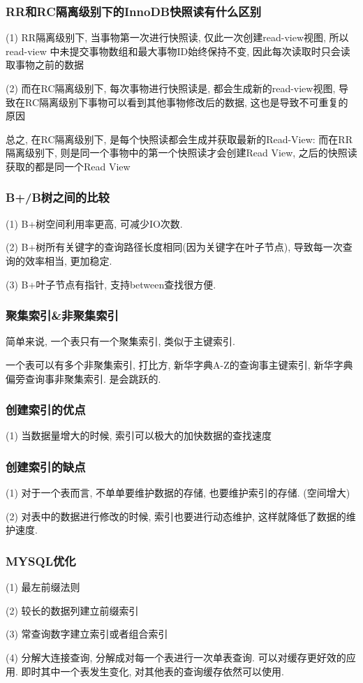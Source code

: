\documentclass[UTF8]{ctexart}
\begin{document}
\subsubsection{RR和RC隔离级别下的InnoDB快照读有什么区别}
(1) RR隔离级别下, 当事物第一次进行快照读, 仅此一次创建read-view视图, 所以read-view
中未提交事物数组和最大事物ID始终保持不变, 因此每次读取时只会读取事物之前的数据 \par
(2) 而在RC隔离级别下, 每次事物进行快照读是, 都会生成新的read-view视图, 导致在RC隔离级别下事物可以看到其他事物修改后的数据, 这也是导致不可重复的原因 \par
总之, 在RC隔离级别下, 是每个快照读都会生成并获取最新的Read-View: 而在RR隔离级别下, 则是同一个事物中的第一个快照读才会创建Read View, 之后的快照读获取的都是同一个Read View \par
\subsubsection{B+/B树之间的比较}
(1) B+树空间利用率更高, 可减少IO次数. \par
(2) B+树所有关键字的查询路径长度相同(因为关键字在叶子节点), 导致每一次查询的效率相当, 更加稳定. \par
(3) B+叶子节点有指针, 支持between查找很方便.
\subsubsection{聚集索引\&非聚集索引}
简单来说, 一个表只有一个聚集索引, 类似于主键索引.

一个表可以有多个非聚集索引, 打比方, 新华字典A-Z的查询事主键索引, 新华字典偏旁查询事非聚集索引. 是会跳跃的.


\subsubsection{创建索引的优点}
(1) 当数据量增大的时候, 索引可以极大的加快数据的查找速度
\subsubsection{创建索引的缺点}
(1) 对于一个表而言, 不单单要维护数据的存储, 也要维护索引的存储. (空间增大)
\par
(2) 对表中的数据进行修改的时候, 索引也要进行动态维护, 这样就降低了数据的维护速度.
\subsubsection{MYSQL优化}
(1) 最左前缀法则 \par
(2) 较长的数据列建立前缀索引 \par
(3) 常查询数字建立索引或者组合索引 \par
(4) 分解大连接查询, 分解成对每一个表进行一次单表查询. 可以对缓存更好效的应用. 即时其中一个表发生变化, 对其他表的查询缓存依然可以使用.
\end{document}
